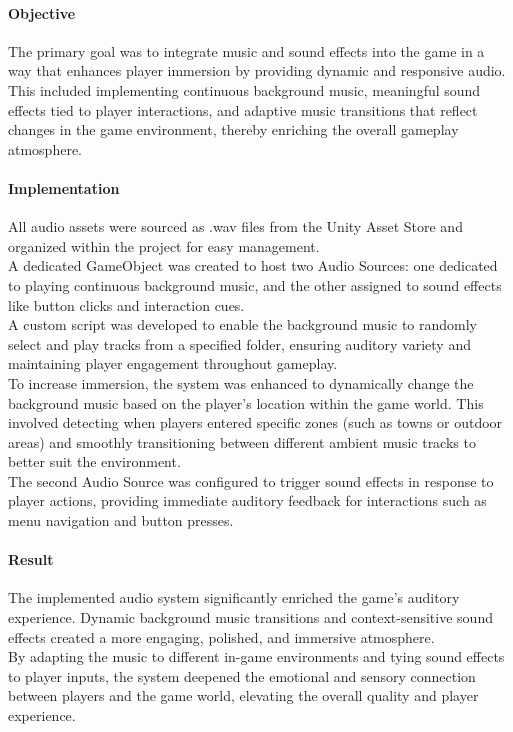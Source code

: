 \documentclass{article}
\begin{document}
\paragraph{Objective}\hfill

The primary goal was to integrate music and sound effects into the game in a way that enhances player immersion by providing dynamic and responsive audio. This included implementing continuous background music, meaningful sound effects tied to player interactions, and adaptive music transitions that reflect changes in the game environment, thereby enriching the overall gameplay atmosphere.

\paragraph{Implementation}\hfill

All audio assets were sourced as .wav files from the Unity Asset Store and organized within the project for easy management.\\

A dedicated GameObject was created to host two Audio Sources: one dedicated to playing continuous background music, and the other assigned to sound effects like button clicks and interaction cues.\\

A custom script was developed to enable the background music to randomly select and play tracks from a specified folder, ensuring auditory variety and maintaining player engagement throughout gameplay.\\

To increase immersion, the system was enhanced to dynamically change the background music based on the player's location within the game world. This involved detecting when players entered specific zones (such as towns or outdoor areas) and smoothly transitioning between different ambient music tracks to better suit the environment.\\

The second Audio Source was configured to trigger sound effects in response to player actions, providing immediate auditory feedback for interactions such as menu navigation and button presses.

\paragraph{Result}\hfill

The implemented audio system significantly enriched the game's auditory experience. Dynamic background music transitions and context-sensitive sound effects created a more engaging, polished, and immersive atmosphere.\\

By adapting the music to different in-game environments and tying sound effects to player inputs, the system deepened the emotional and sensory connection between players and the game world, elevating the overall quality and player experience.
\end{document}
